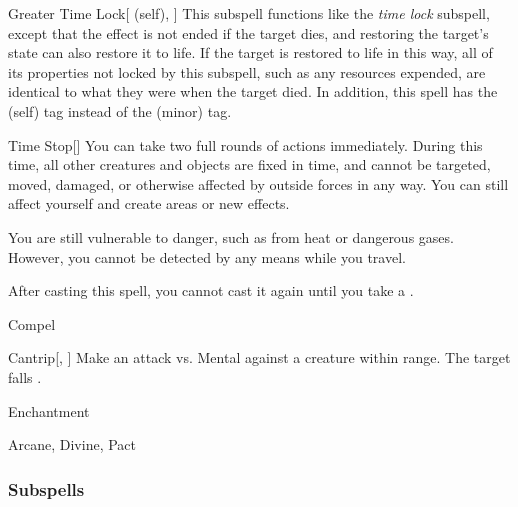 \begin{ability}[\nth{7}]{Greater Time Lock}[ (self), ]
This subspell functions like the \textit{time lock} subspell, except that the effect is not ended if the target dies, and restoring the target's state can also restore it to life.
If the target is restored to life in this way, all of its properties not locked by this subspell, such as any resources expended, are identical to what they were when the target died.
In addition, this spell has the  (self) tag instead of the  (minor) tag.
\end{ability}
\vspace{0.25em}


\begin{ability}[\nth{7}]{Time Stop}[]
You can take two full rounds of actions immediately.
During this time, all other creatures and objects are fixed in time, and cannot be targeted, moved, damaged, or otherwise affected by outside forces in any way.
You can still affect yourself and create areas or new effects.

You are still vulnerable to danger, such as from heat or dangerous gases.
However, you cannot be detected by any means while you travel.

After casting this spell, you cannot cast it again until you take a .
\end{ability}
\vspace{0.25em}

\newpage
\begin{spellsection}{Compel}

\begin{spellheader}
\end{spellheader}


\begin{ability}{Cantrip}[, ]
Make an attack vs. Mental against a creature within \rngmed range.
\hit The target falls .
\end{ability}




 Enchantment

 Arcane, Divine, Pact
\end{spellsection}


\subsubsection{Subspells}


